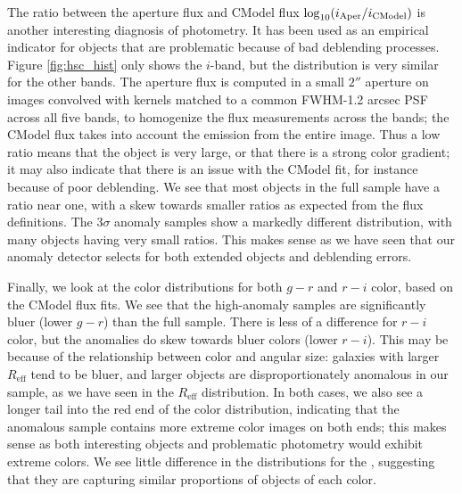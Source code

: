 The ratio between the aperture flux and CModel flux $\log_{10} (i_{\rm Aper}/i_{\rm CModel})$ is another interesting diagnosis of photometry. 
It has been used as an empirical indicator for objects that are problematic because of bad deblending processes.
Figure \ref{fig:hsc_hist} only shows the $i$-band, but the distribution is very similar for the other bands.
The aperture flux is computed in a small $2''$ aperture on images convolved with kernels matched to a common FWHM-1.2 arcsec PSF across all five bands, to homogenize the flux measurements across the bands; the CModel flux takes into account the emission from the entire image. 
Thus a low ratio means that the object is very large, or that there is a strong color gradient; it may also indicate that there is an issue with the CModel fit, for instance because of poor deblending.
We see that most objects in the full sample have a ratio near one, with a skew towards smaller ratios as expected from the flux definitions.
The $3\sigma$ anomaly samples show a markedly different distribution, with many objects having very small ratios.
This makes sense as we have seen that our anomaly detector selects for both extended objects and deblending errors.

Finally, we look at the color distributions for both $g-r$ and $r-i$ color, based on the CModel flux fits.
We see that the high-anomaly samples are significantly bluer (lower $g-r$) than the full sample.
There is less of a difference for $r-i$ color, but the anomalies do skew towards bluer colors (lower $r-i$).
This may be because of the relationship between color and angular size: galaxies with larger $R_\mathrm{eff}$ tend to be bluer, and larger objects are disproportionately anomalous in our sample, as we have seen in the $R_\mathrm{eff}$ distribution.
In both cases, we also see a longer tail into the red end of the color distribution, indicating that the anomalous sample contains more extreme color images on both ends; this makes sense as both interesting objects and problematic photometry would exhibit extreme colors.
We see little difference in the distributions for the , suggesting that they are capturing similar proportions of objects of each color.

